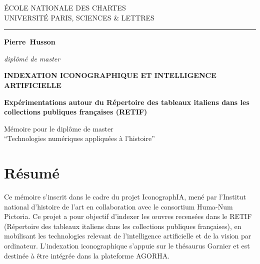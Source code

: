 \documentclass[12pt,twoside]{book}
\author{\PrenomAuteur \textsc{\NomAuteur} - M2 TNAH}
\title{\TitreMemoire}
\newcommand{\PrenomAuteur}{Pierre}
\newcommand{\NomAuteur}{Husson}
\newcommand{\Auteur}{\PrenomAuteur\ \NomAuteur}
\newcommand{\TitreMemoire}{Indexation iconographique et intelligence artificielle}
\newcommand{\SousTitreMemoire}{Expérimentations autour du Répertoire des tableaux italiens dans les collections publiques françaises (RETIF)}
\begin{document}
	\begin{titlepage}
		\begin{center}
			
			\bigskip
			
			\begin{large}				
				ÉCOLE NATIONALE DES CHARTES\\
				UNIVERSITÉ PARIS, SCIENCES \& LETTRES
			\end{large}
			\begin{center}\rule{2cm}{0.02cm}\end{center}
			
			\bigskip
			\bigskip
			\bigskip
			\begin{Large}
				\textbf{\Auteur}\\
			\end{Large}
			\begin{normalsize}
				\textit{diplômé de master}
			\end{normalsize}
			
			\bigskip
			\bigskip
			\bigskip
			
			\begin{Huge}
				\textbf{\MakeUppercase{\TitreMemoire}}\\
			\end{Huge}
			\bigskip
			\bigskip
			\begin{LARGE}
				\textbf{\SousTitreMemoire}\\
			\end{LARGE}
			
			\bigskip
			\bigskip
			\bigskip
			\begin{large}
			\end{large}
			\vfill
			
			\begin{large}
				Mémoire 
				pour le diplôme de master \\
				\enquote{Technologies numériques appliquées à l'histoire} \\
			\end{large}
			
		\end{center}
	\end{titlepage}

	\thispagestyle{empty}	
	\cleardoublepage
	
\frontmatter

	\chapter{Résumé}
\medskip
	Ce mémoire s’inscrit dans le cadre du projet IconographIA, mené par l’Institut national d’histoire de l’art en collaboration avec le consortium Huma-Num Pictoria. Ce projet a pour objectif d’indexer les œuvres recensées dans le RETIF (Répertoire des tableaux italiens dans les collections publiques françaises), en mobilisant les technologies relevant de l’intelligence artificielle et de la vision par ordinateur. L’indexation iconographique s’appuie sur le thésaurus Garnier et est destinée à être intégrée dans la plateforme AGORHA.
    
\end{document}
